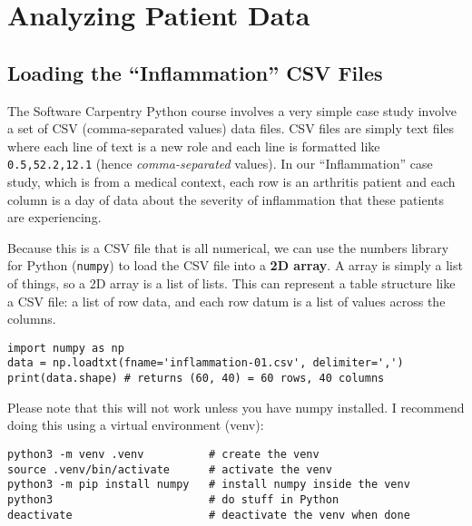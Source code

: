 \section{Analyzing Patient Data}
\begin{multicols*}{2}
\subsection{Loading the ``Inflammation'' CSV Files}
\par
The Software Carpentry Python course involves a very simple case study involve a set of CSV (comma-separated values) data files. CSV files are simply text files where each line of text is a new role and each line is formatted like \texttt{0.5,52.2,12.1} (hence \textit{comma-separated} values). In our ``Inflammation'' case study, which is from a medical context, each row is an arthritis patient and each column is a day of data about the severity of inflammation that these patients are experiencing.
\par
Because this is a CSV file that is all numerical, we can use the numbers library for Python (\texttt{numpy}) to load the CSV file into a \textbf{2D array}. A array is simply a list of things, so a 2D array is a list of lists. This can represent a table structure like a CSV file: a list of row data, and each row datum is a list of values across the columns.

\vspace{-4mm}
\begin{verbatim}
import numpy as np
data = np.loadtxt(fname='inflammation-01.csv', delimiter=',')
print(data.shape) # returns (60, 40) = 60 rows, 40 columns
\end{verbatim}

\par
Please note that this will not work unless you have numpy installed. I recommend doing this using a virtual environment (venv):

\vspace{-4mm}
\begin{verbatim}
python3 -m venv .venv          # create the venv
source .venv/bin/activate      # activate the venv
python3 -m pip install numpy   # install numpy inside the venv
python3                        # do stuff in Python
deactivate                     # deactivate the venv when done
\end{verbatim}


\end{multicols*}

